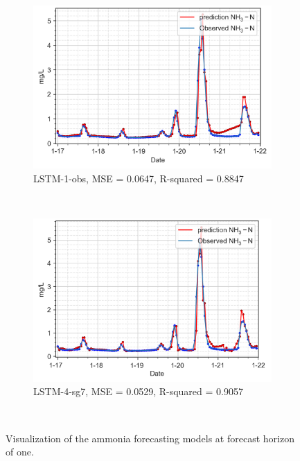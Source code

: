 \begin{figure}[!ht]
  \centering
  \begin{subfigure}[t]{0.75\textwidth}
    \includegraphics[width=\linewidth]{imgs/results/steps/nh3-lstm-1-fc1.png}
    \caption{LSTM-1-obs, MSE = 0.0647, R-squared = 0.8847} \label{fig:nh3-lstm-1-fc1}
  \end{subfigure}\\
  \vspace{2em}
  \begin{subfigure}[t]{0.75\textwidth}
    \includegraphics[width=\linewidth]{imgs/results/steps/nh3-lstm-4-fc1.png}
    \caption{LSTM-4-sg7, MSE = 0.0529, R-squared = 0.9057} \label{fig:nh3-lstm-4-fc1}
  \end{subfigure}\\
\caption{Visualization of the ammonia forecasting models at forecast horizon of one.} \label{fig:nh3-forecast-fc1}
\end{figure}

